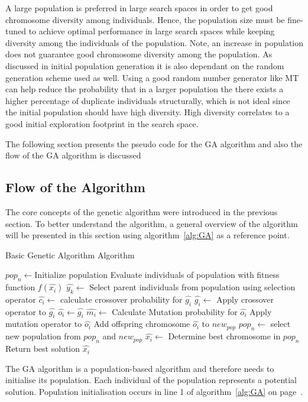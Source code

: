A large population is preferred in large search spaces in order to get good chromosome diversity among individuals. Hence, the population size must be fine-tuned to achieve optimal performance in large search spaces while keeping diversity among the individuals of the population\cite{AdaptiveSAGA,CompuIntelligenceIntro}. Note, an increase in population does not guarantee good chromosome diversity among the population. As discussed in initial population generation it is also dependant on the random generation scheme used as well. Using a good random number generator like \gls{MT} can help reduce the probability that in a larger population the there exists a higher percentage of duplicate individuals structurally, which is not ideal since the initial population should have high diversity. High diversity correlates to a good initial exploration footprint in the search space.


The following section presents the pseudo code for the \gls{GA} algorithm and also the flow of the \gls{GA} algorithm is discussed
\subsection{Flow of the Algorithm}
The core concepts of the genetic algorithm were introduced in the previous section. To better understand the algorithm, a general overview of the algorithm will be presented in this section using algorithm~\ref{alg:GA} as a reference point.
\begin{algorithm}[H]
\caption{Basic Genetic Algorithm Algorithm\cite{FamilyGA,AdaptiveSAGA,DistributedHierarchicalGA,SelfAdaptiveGA}}
\label{alg:GA}
	\begin{algorithmic}[1]
		\State $pop_n\leftarrow$Initialize population
    \State Evaluate individuals of population with fitness function $f(\hat{x_i})$
    \State $\hat{y_k} \leftarrow$ Select parent individuals from population using selection operator
		\Repeat
    \State $\hat{c_i} \leftarrow$ calculate crossover probability for $\hat{g_i}$
    \State $\hat{g_i} \leftarrow$ Apply crossover operator to $\hat{g_i}$
				\EndIf
        \State $\hat{o_i} \leftarrow \hat{g_i}$
        \State $\hat{m_i}\leftarrow$ Calculate Mutation probability for $\hat{o_i}$
        \State Apply mutation operator to $\hat{o_i}$
				\EndIf
        \State Add offspring chromosome $\hat{o_i}$ to $new_{pop}$
			\EndFor
		\State $pop_n \leftarrow$ select new population from $pop_n$ and $new_{pop}$
		\EndWhile
    \State $\hat{x_i} \leftarrow$ Determine best chromosome in $pop_n$
    \State Return best solution $\hat{x_i}$
	\end{algorithmic}
\end{algorithm}
The \gls{GA} algorithm is a population-based algorithm and therefore needs to initialise its population. Each individual of the population represents a potential solution. Population initialisation occurs in line 1 of algorithm~\ref{alg:GA} on page~\pageref{alg:GA}. 

